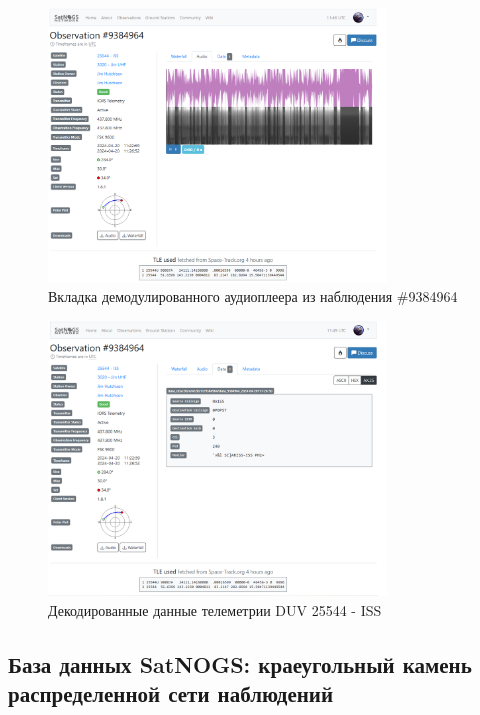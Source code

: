 \documentclass[14pt, a4paper]{extreport}
\begin{document}
    
    \begin{figure}[h!]
        \centering
        \includegraphics[width=0.8\textwidth]{satnogs_decoded_telemetry_example}
        \caption{Вкладка демодулированного аудиоплеера из наблюдения \#9384964}
        \label{fig:satnogs_decoded_telemetry_example}
    \end{figure}


    \begin{figure}[h!]
        \centering
        \includegraphics[width=0.8\textwidth]{satnogs_observation_data_example}
        \caption{Декодированные данные телеметрии DUV 25544 - ISS}
        \label{fig:satnogs_observation_data_example}
    \end{figure}

    \subsection{База данных SatNOGS: краеугольный камень распределенной сети наблюдений}
\end{document}
